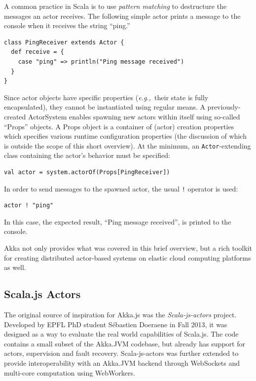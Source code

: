 \documentclass{sig-alternate}
\newcommand{\eg}{{\em e.g.,~}}
\begin{document}
A common practice in Scala is to use {\em pattern matching} to destructure the messages an actor receives. The following simple actor prints a message to the console when it receives the string ``ping.''
\begin{lstlisting}
class PingReceiver extends Actor {
  def receive = {
    case "ping" => println("Ping message received")
  }
}
\end{lstlisting}
\noindent
Since actor objects have specific properties (\eg their state is fully encapsulated), they cannot be instantiated using regular means. A previously-created ActorSystem enables spawning new actors within itself using so-called ``Props'' objects. A Props object is a container of (actor) creation properties which specifies various runtime configuration properties (the discussion of which is outside the scope of this short overview). At the minimum, an \verb|Actor|-extending class containing the actor's behavior must be specified:
\begin{lstlisting}
val actor = system.actorOf(Props[PingReceiver])
\end{lstlisting}
\noindent
In order to send messages to the spawned actor, the usual \verb|!| operator is used:
\begin{lstlisting}
actor ! "ping"
\end{lstlisting}
\noindent
In this case, the expected result, ``Ping message received'', is printed to the console.

Akka not only provides what was covered in this brief overview, but a rich toolkit for creating distributed actor-based systems on elastic cloud computing platforms as well.


\subsection{Scala.js Actors}

The original source of inspiration for Akka.js was the \textit{Scala-js-actors} project.
Developed by EPFL PhD student Sébastien Doeraene in Fall 2013, it was designed as a way to evaluate the real world capabilities of Scala.js.
The code contains a small subset of the Akka.JVM codebase, but already has support for actors, supervision and fault recovery.
Scala-js-actors was further extended to provide interoperability with an Akka.JVM backend through WebSockets and multi-core computation using WebWorkers.
\end{document}
